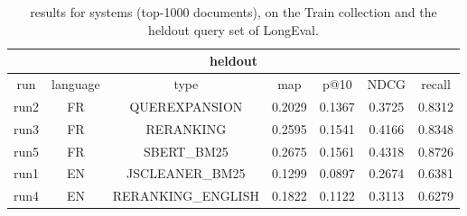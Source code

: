 \begin{table}[h!]
    \centering
    \begin{tabular}{ |c|c|c|c|c|c|c| }
        \hline
        \hline
        \multicolumn{7}{|c|}{heldout} \\ \hline
        run  & language & type & map & p@10 & NDCG & recall \\ \hline
        run2 &   FR   & QUEREXPANSION & 0.2029 & 0.1367 & 0.3725 & 0.8312 \\ \hline
        run3 &   FR   & RERANKING & 0.2595 & 0.1541 & 0.4166 & 0.8348 \\ \hline
        run5 &   FR   & SBERT\_BM25 & 0.2675 & 0.1561 & 0.4318 & 0.8726 \\ \hline
        \hline
        run1 &   EN   & JSCLEANER\_BM25 & 0.1299 & 0.0897 & 0.2674 & 0.6381 \\ \hline
        run4 &   EN   & RERANKING\_ENGLISH & 0.1822 & 0.1122 & 0.3113 & 0.6279 \\ \hline
    \end{tabular}
    \caption{results for systems (top-1000 documents), on the Train collection and the heldout query set of LongEval.}
    \label{tab:results_submission_heldout}
\end{table}

